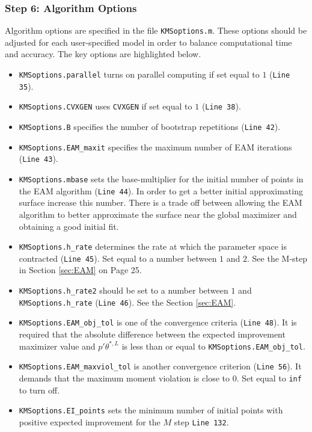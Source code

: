 \documentclass[12pt]{article}
\def\code#1{\texttt{#1}}
\begin{document}
\subsubsection*{Step 6: Algorithm Options}
Algorithm options are specified in the file \code{KMSoptions.m}.  These options should be adjusted for each user-specified model in order to balance computational time and accuracy.  The key options are highlighted below.
\begin{itemize}
\item \code{KMSoptions.parallel} turns on parallel computing if set equal to $1$ (\code{Line 35}).
\item \code{KMSoptions.CVXGEN} uses \code{CVXGEN} if set equal to $1$ (\code{Line 38}).
\item \code{KMSoptions.B} specifies the number of bootstrap repetitions (\code{Line 42}).
\item \code{KMSoptions.EAM\_maxit} specifies the maximum number of EAM iterations (\code{Line 43}).
\item \code{KMSoptions.mbase} sets the base-multiplier for the initial number of points in the EAM algorithm (\code{Line 44}).  In order to get a better initial approximating surface increase this number.  There is a trade off between allowing the EAM algorithm to better approximate the surface near the global maximizer and obtaining a good initial fit.
\item \code{KMSoptions.h\_rate} determines the rate at which the parameter space is contracted (\code{Line 45}).  Set equal to a number between $1$ and $2$.  See the M-step in Section \ref{sec:EAM} on Page 25.
\item   \code{KMSoptions.h\_rate2} should be set to a number between $1$ and \code{KMSoptions.h\_rate} (\code{Line 46}).  See the Section \ref{sec:EAM}.
\item \code{KMSoptions.EAM\_obj\_tol} is one of the convergence criteria (\code{Line 48}).  It is required that the absolute difference between the expected improvement maximizer value and $p'\theta^{*,L}$ is less than or equal to \code{KMSoptions.EAM\_obj\_tol}.
\item \code{KMSoptions.EAM\_maxviol\_tol} is another convergence criterion (\code{Line 56}). It demands that the maximum moment violation is close to $0.$  Set equal to \code{inf} to turn off.
\item \code{KMSoptions.EI\_points} sets the minimum number of initial points with positive expected improvement for the $M$ step \code{Line 132}.
\end{itemize}
\end{document}
